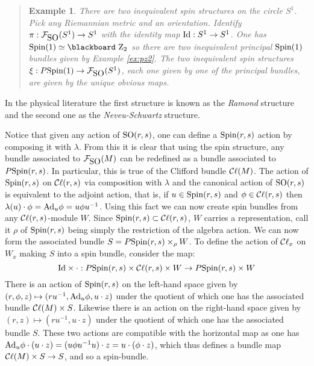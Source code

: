 \documentclass[12pt,titlepage]{article}
\def\bbf#1{\hbox{\blackboard #1}}
\def\lZ{\bbf Z}
\def\cC{{\cal C}}
\def\cF{{\cal F}}
\def\Ad{\hbox{Ad}}
\def\Cl{{\cC\ell}}
\def\SO{\hbox{SO}}
\def\Spin{\hbox{Spin}}
\def\Id{\hbox{Id}}
\newtheorem{eg}{Example}
\newenvironment{example}{\begin{quote}\begin{eg}}{\end{eg}\end{quote}}
\begin{document}
\begin{example}\label{ex:spins1}
There are two inequivalent spin structures on the  circle \(S^1\). 
Pick any   Riemannian metric and an orientation. 
Identify \(\pi:\cF_{\SO}(S^1)\to S^1\) with the identity
map \(\Id:S^1\to S^1\). One has \(\Spin(1) \simeq \lZ_2\) so there are
two inequivalent principal \(\Spin(1)\) bundles given by Example
\ref{ex:pz2}. The two inequivalent spin structures 
\(\xi:P\Spin(1) \to \cF_{\SO}(S^1)\), each one given by one of the principal
bundles, are given by the unique obvious maps. 
\end{example}
In the physical literature the first structure is known as the {\em
Ramond\/} 
%
structure and the second one as the {\em Neveu-Schwartz\/}
%
structure. 



Notice that given any action of \(\SO(r,s)\), one can define a
\(\Spin(r,s)\) action by composing it with \(\lambda\).
From this it is clear
that using the spin structure, any bundle associated to \(\cF_{\SO}(M)\) can
be redefined as a bundle associated to \(P\Spin(r,s)\). In particular,
this is true of
the Clifford bundle \(\Cl(M)\). The action of \(\Spin(r,s)\) on
\(\Cl(r,s)\) via composition with \(\lambda\) and the canonical action
of \(\SO(r,s)\)  is equivalent to the adjoint action, that is, if \(u\in
\Spin(r,s)\) and \(\phi\in\Cl(r,s)\) then \(\lambda(u)\cdot\phi=\Ad_u\phi
= u\phi u^{-1}\). Using this fact we can now create spin bundles from
any \(\Cl(r,s)\)-module \(W\). Since \(\Spin(r,s)\subset\Cl(r,s)\), \(W\)
carries a representation, call it \(\rho\) of \(\Spin(r,s)\) being simply
the restriction of the algebra action. We can now form the associated
bundle \(S=P\Spin(r,s)\times_\rho W\). To define the action of
\(\Cl_x\) on \(W_x\) making \(S\) into a spin bundle, consider the map:
\begin{equation}\label{eq:spinbdef}%
\Id\times\cdot:P\Spin(r,s)\times
\Cl(r,s) \times W \to P\Spin(r,s)\times W
\end{equation}%
There is an action of \(\Spin(r,s)\) on the left-hand space given by
\((r,\phi,z)\mapsto (ru^{-1}, \Ad_u\phi, u\cdot z)\) under the
quotient of which one has  the associated bundle
\(\Cl(M)\times S\). Likewise there is an action on the right-hand space
given by \((r,z)\mapsto (ru^{-1},  u\cdot z)\) under the
quotient of which one has the associated bundle
\(S\). These two actions are compatible with the horizontal map as one
has \(\Ad_u\phi\cdot (u\cdot z) = (u\phi u^{-1}u)\cdot
z=u\cdot(\phi\cdot z)\), which thus defines a bundle map
\(\Cl(M)\times S \to S\), and so a spin-bundle.
\end{document}
